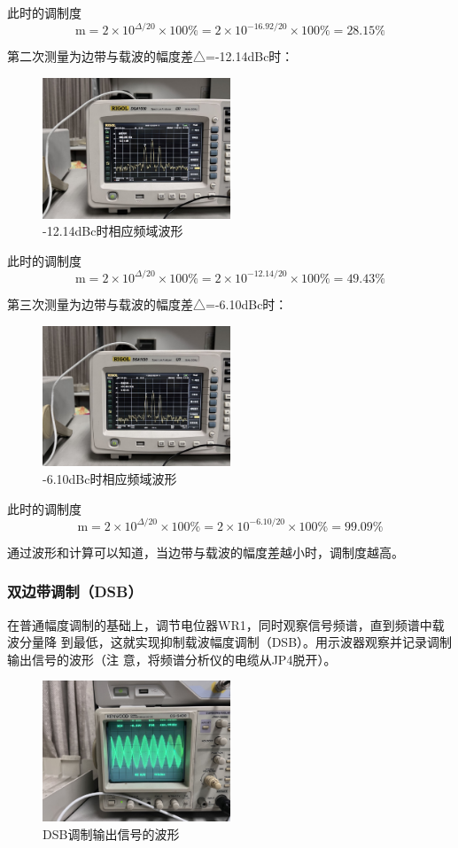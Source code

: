 \documentclass{../source/Experiment}
\begin{document}
此时的调制度$$\mathrm{m}=2 \times 10^{\Delta / 20} \times 100 \%=2 \times 10^{-16.92 / 20} \times 100 \%
=28.15\%$$

第二次测量为边带与载波的幅度差△=-12.14dBc时：
\begin{figure}[H]
    \centering
    \includegraphics[width = 0.5\textwidth]{lab6/2.jpg}
    \caption{-12.14dBc时相应频域波形}
\end{figure}
此时的调制度$$\mathrm{m}=2 \times 10^{\Delta / 20} \times 100 \%=2 \times 10^{-12.14 / 20} \times 100 \%
=49.43\%$$

第三次测量为边带与载波的幅度差△=-6.10dBc时：
\begin{figure}[H]
    \centering
    \includegraphics[width = 0.5\textwidth]{lab6/3.jpg}
    \caption{-6.10dBc时相应频域波形}
\end{figure}
此时的调制度$$\mathrm{m}=2 \times 10^{\Delta / 20} \times 100 \%=2 \times 10^{-6.10 / 20} \times 100 \%
=99.09\%$$

通过波形和计算可以知道，当边带与载波的幅度差越小时，调制度越高。

\subsubsection{双边带调制（DSB）}
在普通幅度调制的基础上，调节电位器WR1，同时观察信号频谱，直到频谱中载波分量降
到最低，这就实现抑制载波幅度调制（DSB）。用示波器观察并记录调制输出信号的波形（注
意，将频谱分析仪的电缆从JP4脱开）。

\begin{figure}[H]
    \centering
    \includegraphics[width = 0.5\textwidth]{lab6/4.jpg}
    \caption{DSB调制输出信号的波形}
\end{figure}
\end{document}

